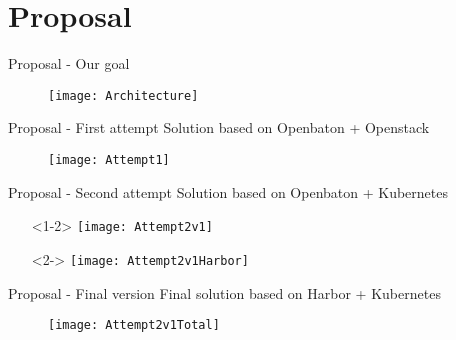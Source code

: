 \section{Proposal}
\begin{frame}{Proposal - Our goal}
  \begin{figure}
    \centering
    \texttt{[image: Architecture]}
  \end{figure}
\end{frame}

\begin{frame}{Proposal - First attempt}
  Solution based on Openbaton + Openstack
  \begin{figure}
    \centering
    \texttt{[image: Attempt1]}
  \end{figure}
\end{frame}

\begin{frame}{Proposal - Second attempt}
  Solution based on Openbaton + Kubernetes
  \begin{itemize}
    \centering
  \item[]<1-2> \texttt{[image: Attempt2v1]}
  \item[]<2-> \texttt{[image: Attempt2v1Harbor]}
  \end{itemize}
\end{frame}

\begin{frame}{Proposal - Final version}
  Final solution based on Harbor + Kubernetes
  \begin{figure}
    \centering
    \texttt{[image: Attempt2v1Total]}
  \end{figure}
\end{frame}
